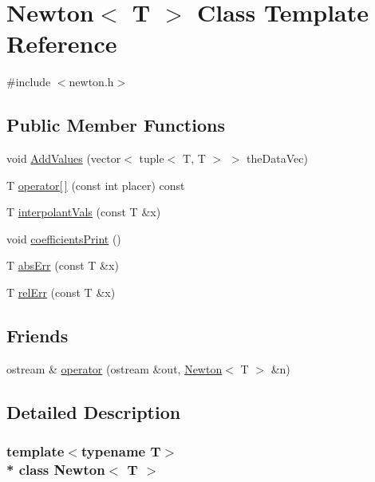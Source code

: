 \hypertarget{classNewton}{}\section{Newton$<$ T $>$ Class Template Reference}
\label{classNewton}


{\ttfamily \#include $<$newton.\+h$>$}

\subsection*{Public Member Functions}
\begin{DoxyCompactItemize}
\item 
void \hyperlink{classNewton_a42347f7d7cbfe699bddf8cb74ae9645d}{Add\+Values} (vector$<$ tuple$<$ T, T $>$ $>$ the\+Data\+Vec)
\item 
T \hyperlink{classNewton_a0eab8712e66fed6189ad3d2f691972aa}{operator\mbox{[}$\,$\mbox{]}} (const int placer) const 
\item 
T \hyperlink{classNewton_a7baf01223ebc374c82a4ee7a0c919954}{interpolant\+Vals} (const T \&x)
\item 
void \hyperlink{classNewton_a17b9c9dbdf7033d63571ed2106b3d18e}{coefficients\+Print} ()
\item 
T \hyperlink{classNewton_abfb1cb15bb82971fa3b2d9d3fa2a3ab6}{abs\+Err} (const T \&x)
\item 
T \hyperlink{classNewton_a99f0781abd1b14be345694c9e321540f}{rel\+Err} (const T \&x)
\end{DoxyCompactItemize}
\subsection*{Friends}
\begin{DoxyCompactItemize}
\item 
ostream \& \hyperlink{classNewton_a01166949d7a7c3e8518eeb3ce99e6678}{operator} (ostream \&out, \hyperlink{classNewton}{Newton}$<$ T $>$ \&n)
\end{DoxyCompactItemize}


\subsection{Detailed Description}
\subsubsection*{template$<$typename T$>$\\*
class Newton$<$ T $>$}

